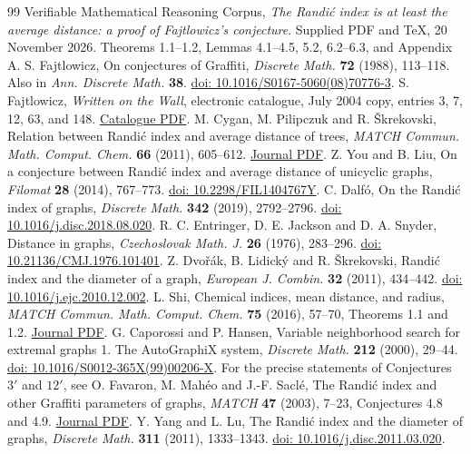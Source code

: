 \documentclass[11pt,a4paper]{article}
\theoremstyle{remark}\newtheorem*{remark}{Remark}
\newcommand{\doi}[1]{\href{https://doi.org/#1}{doi: #1}}
\begin{document}
\begin{thebibliography}{99}\small
{} Verifiable Mathematical Reasoning Corpus, \emph{The Randi\'c index is at least the average distance: a proof of Fajtlowicz's conjecture}. Supplied PDF and TeX, 20 November 2026. Theorems 1.1--1.2, Lemmas 4.1--4.5, 5.2, 6.2--6.3, and Appendix A.
 S. Fajtlowicz, On conjectures of Graffiti, \emph{Discrete Math.} \textbf{72} (1988), 113--118. Also in \emph{Ann. Discrete Math.} \textbf{38}. \doi{10.1016/S0167-5060(08)70776-3}.
 S. Fajtlowicz, \emph{Written on the Wall}, electronic catalogue, July 2004 copy, entries 3, 7, 12, 63, and 148. \href{https://independencenumber.wordpress.com/wp-content/uploads/2012/08/wow-july2004.pdf}{Catalogue PDF}.
 M. Cygan, M. Pilipczuk and R. \v{S}krekovski, Relation between Randi\'c index and average distance of trees, \emph{MATCH Commun. Math. Comput. Chem.} \textbf{66} (2011), 605--612. \href{https://match.pmf.kg.ac.rs/electronic_versions/Match66/n2/match66n2_605-612.pdf}{Journal PDF}.
 Z. You and B. Liu, On a conjecture between Randi\'c index and average distance of unicyclic graphs, \emph{Filomat} \textbf{28} (2014), 767--773. \doi{10.2298/FIL1404767Y}.
 C. Dalf\'o, On the Randi\'c index of graphs, \emph{Discrete Math.} \textbf{342} (2019), 2792--2796. \doi{10.1016/j.disc.2018.08.020}.
 R. C. Entringer, D. E. Jackson and D. A. Snyder, Distance in graphs, \emph{Czechoslovak Math. J.} \textbf{26} (1976), 283--296. \doi{10.21136/CMJ.1976.101401}.
 Z. Dvo\v{r}\'ak, B. Lidick\'y and R. \v{S}krekovski, Randi\'c index and the diameter of a graph, \emph{European J. Combin.} \textbf{32} (2011), 434--442. \doi{10.1016/j.ejc.2010.12.002}.
 L. Shi, Chemical indices, mean distance, and radius, \emph{MATCH Commun. Math. Comput. Chem.} \textbf{75} (2016), 57--70, Theorems 1.1 and 1.2. \href{https://match.pmf.kg.ac.rs/electronic_versions/Match75/n1/match75n1_57-70.pdf}{Journal PDF}.
 G. Caporossi and P. Hansen, Variable neighborhood search for extremal graphs 1. The AutoGraphiX system, \emph{Discrete Math.} \textbf{212} (2000), 29--44. \doi{10.1016/S0012-365X(99)00206-X}. For the precise statements of Conjectures $3'$ and $12'$, see O. Favaron, M. Mah\'eo and J.-F. Sacl\'e, The Randi\'c index and other Graffiti parameters of graphs, \emph{MATCH} \textbf{47} (2003), 7--23, Conjectures 4.8 and 4.9. \href{https://match.pmf.kg.ac.rs/electronic_versions/Match47/match47_7-23.pdf}{Journal PDF}.
 Y. Yang and L. Lu, The Randi\'c index and the diameter of graphs, \emph{Discrete Math.} \textbf{311} (2011), 1333--1343. \doi{10.1016/j.disc.2011.03.020}.

\end{thebibliography}
\end{document}
